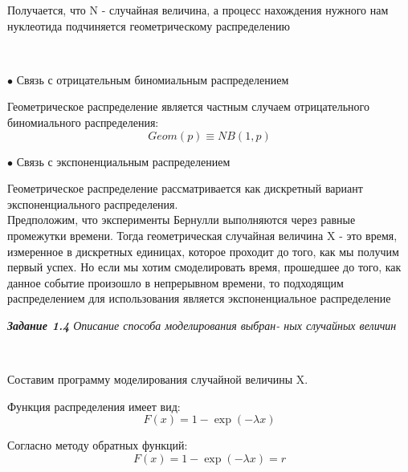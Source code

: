 \documentclass[a4paper,12pt, oneside]{book}
\begin{document}
{{Получается, что N -  случайная величина, а процесс нахождения нужного нам нуклеотида  подчиняется геометрическому распределению

\vspace{5mm}
\\
\vspace{5mm}

{\sf$\bullet$ Связь с отрицательным биномиальным распределением }
\vspace{5mm}

Геометрическое распределение является частным случаем отрицательного биномиального распределения:
$$
Geom(p) \equiv NB(1,p)
$$

\vspace{5mm}
{\sf$\bullet$ Связь с экспоненциальным распределением }
\vspace{5mm}

Геометрическое распределение рассматривается как дискретный вариант экспоненциального распределения.\\

Предположим, что эксперименты Бернулли выполняются через равные промежутки времени. Тогда геометрическая случайная величина X - это время, измеренное в дискретных единицах, которое проходит до того, как мы получим первый успех. Но если мы хотим смоделировать время, прошедшее до того, как данное событие произошло в непрерывном времени, то подходящим распределением для использования является экспоненциальное распределение




\newpage
\textit{\textbf{Задание 1.4} Описание способа моделирования выбран-
	ных случайных величин}
\vspace{13mm}

\vspace{5mm}
\\
\vspace{5mm}


Составим программу моделирования случайной величины X.

Функция распределения имеет вид:
$$
F(x) = 1 - \exp(-\lambda x)
$$

Согласно методу обратных функций:\cite{rt1}
$$
F(x) = 1 - \exp(- \lambda x) = r
$$

}}
\end{document}
